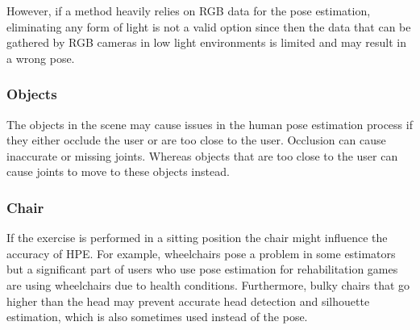 However, if a method heavily relies on RGB data for the pose estimation, eliminating any form of light is not a valid option since then the data that can be gathered by RGB cameras in low light environments is limited and may result in a wrong pose.

\subsubsection{Objects}

The objects in the scene may cause issues in the human pose estimation process if they either occlude the user or are too close to the user. Occlusion can cause inaccurate or missing joints. Whereas objects that are too close to the user can cause joints to move to these objects instead.

\subsubsection{Chair}

If the exercise is performed in a sitting position the chair might influence the accuracy of HPE. For example, wheelchairs pose a problem in some estimators but a significant part of users who use pose estimation for rehabilitation games are using wheelchairs due to health conditions. Furthermore, bulky chairs that go higher than the head may prevent accurate head detection and
 silhouette estimation, which is also sometimes used instead of the pose.
